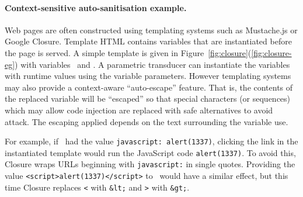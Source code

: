 
\paragraph{Context-sensitive auto-sanitisation example.} %
%
%
%
Web pages are often constructed using templating systems \cite{SSS11} such as Mustache.js or Google Closure.
Template HTML contains variables that are instantiated before the page is served.
A simple template is given in Figure~\ref{fig:closure}(\ref{fig:closure-eg}) with variables \linkvar\ and \linktextvar.
A parametric transducer can instantiate the variables with runtime values using the variable parameters.
However templating systems may also provide a context-aware ``auto-escape'' feature.
That is, the contents of the replaced variable will be ``escaped'' so that special characters (or sequences) which may allow code injection are replaced with safe alternatives to avoid attack.
The escaping applied depends on the text surrounding the variable use.

For example, if \linkvar\ had the value \texttt{javascript: alert(1337)}, clicking the link in the instantiated template would run the JavaScript code \texttt{alert(1337)}.
To avoid this, Closure wraps URLs beginning with \texttt{javascript:} in single quotes.
Providing the value \texttt{<script>alert(1337)</script>} to \linktextvar\ would have a similar effect, but this time Closure replaces \texttt{<} with \texttt{\&lt;} and \texttt{>} with \texttt{\&gt;}.

